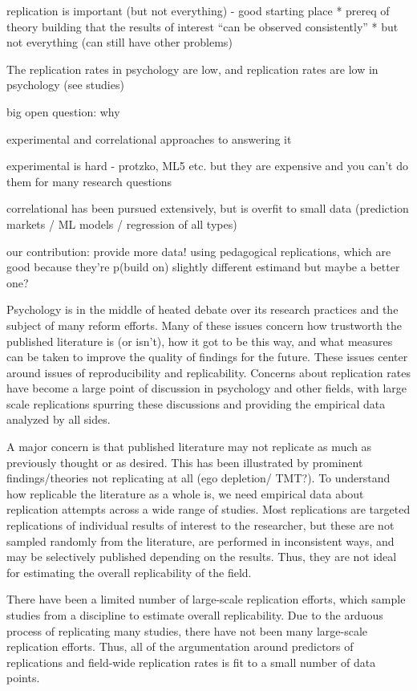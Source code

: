 \documentclass[
  english,
  a4paper,
]{article}
\begin{document}
replication is important (but not everything) - good starting place
* prereq of theory building that the results of interest ``can be observed consistently''
* but not everything (can still have other problems)

The replication rates in psychology are low, and
replication rates are low in psychology (see studies)

big open question: why

experimental and correlational approaches to answering it

experimental is hard - protzko, ML5 etc. but they are expensive and you can't do them for many research questions

correlational has been pursued extensively, but is overfit to small data (prediction markets / ML models / regression of all types)

our contribution: provide more data!
using pedagogical replications, which are good because they're p(build on)
slightly different estimand but maybe a better one?

Psychology is in the middle of heated debate over its research practices and the subject of many reform efforts. Many of these issues concern how trustworth the published literature is (or isn't), how it got to be this way, and what measures can be taken to improve the quality of findings for the future. These issues center around issues of reproducibility and replicability. Concerns about replication rates have become a large point of discussion in psychology and other fields, with large scale replications spurring these discussions and providing the empirical data analyzed by all sides.

A major concern is that published literature may not replicate as much as previously thought or as desired. This has been illustrated by prominent findings/theories not replicating at all (ego depletion/ TMT?). To understand how replicable the literature as a whole is, we need empirical data about replication attempts across a wide range of studies. Most replications are targeted replications of individual results of interest to the researcher, but these are not sampled randomly from the literature, are performed in inconsistent ways, and may be selectively published depending on the results. Thus, they are not ideal for estimating the overall replicability of the field.

There have been a limited number of large-scale replication efforts, which sample studies from a discipline to estimate overall replicability. Due to the arduous process of replicating many studies, there have not been many large-scale replication efforts. Thus, all of the argumentation around predictors of replications and field-wide replication rates is fit to a small number of data points.
\end{document}
